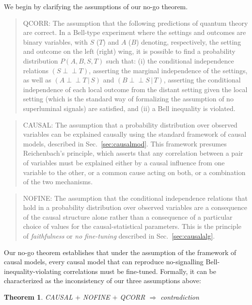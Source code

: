 \documentclass[letterpaper,onecolumn,nofootinbib]{revtex4}
\newtheorem{theorem}{Theorem}
\def\indep{\perp\!\!\!\!\perp}
\begin{document}
We begin by clarifying the assumptions of our  no-go theorem.

\begin{quote}
QCORR:  The assumption that the following predictions of quantum theory are correct.  In a Bell-type experiment where the settings and outcomes are binary variables, with $S$ ($T$) and $A$ ($B$) denoting, respectively, the setting and outcome on the left (right) wing, it is possible to find a probability distribution $P(A,B,S,T)$ such that: (i) the conditional independence relations $\left( S\indep T\right)$, asserting the marginal independence of the
settings, as well as $\left( A\indep T\,|\,S\right) $ and $\left( B\indep S\,|\,T\right) $, asserting the conditional independence of each local outcome from the distant setting given the local setting (which is the standard way of formalizing the assumption of no superluminal signals) are satisfied, and (ii) a Bell inequality is violated. 
\end{quote}


\begin{quote}
CAUSAL:  The assumption that a probability distribution over observed variables 
can be explained causally using the standard framework of causal models, described in Sec.~\ref{sec:causalmod}.  This framework presumes Reichenbach's principle, which asserts that any correlation between a pair of variables must be explained either by a causal influence from one variable to the other, or a common cause acting on both, or a combination of the two mechanisms.  
\end{quote}

\begin{quote}
NOFINE: The assumption that the conditional independence relations that hold in a probability distribution over observed variables 
are a consequence of the causal structure alone rather than a consequence of a particular choice of values for the causal-statistical parameters.  This is the principle of {\em faithfulness} or {\em no fine-tuning} described in Sec.~\ref{sec:causalalg}.
\end{quote}

Our no-go theorem establishes that under the assumption of the framework of causal models,
 every causal model that can reproduce no-signalling Bell-inequality-violating correlations must be fine-tuned.  Formally, it can be characterized as the inconsistency of our three assumptions above:

\begin{theorem}
CAUSAL $+$ NOFINE $+$ QCORR $\Rightarrow$ contradiction
\end{theorem}
\end{document}
